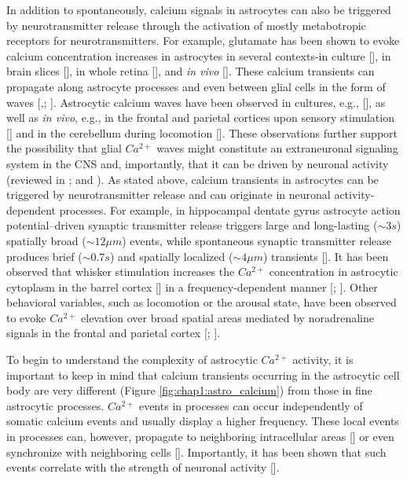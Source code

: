In addition to spontaneously, calcium signals in astrocytes can also be triggered by neurotransmitter release through the activation of mostly metabotropic receptors for neurotransmitters.
For example, glutamate has been shown to evoke calcium concentration increases in astrocytes in several contexts-in culture [\cite{cornell-bell1990}], in brain slices [\cite{dani1992}], in whole retina [\cite{newman1997calcium}], and \textit{in vivo} [\cite{wang2006}].
These calcium transients can propagate along astrocyte processes and even between glial cells in the form of waves [\cite{cornell-bell1990},\cite{dani1992}; \cite{hirase2004} \cite{nimmerjahn2004}]. 
Astrocytic calcium waves have been observed in cultures, e.g., [\cite{cornell-bell1990}], as well as \textit{in vivo}, e.g., in the frontal and parietal cortices upon sensory stimulation [\cite{ding2013}] and in the cerebellum during locomotion [\cite{nimmerjahn2009}].
These observations further support the possibility that glial $Ca^{2+}$ waves might constitute an extraneuronal signaling system in the CNS and, importantly, that it can be driven by neuronal activity (reviewed in \cite{araque2014gliotransmitters}; and \cite{bazargani2016}). 
As stated above, calcium transients in astrocytes can be triggered by neurotransmitter release and can originate in neuronal activity-dependent processes. 
For example, in hippocampal dentate gyrus astrocyte action potential–driven synaptic transmitter release triggers large and long-lasting ($\sim3 s$) spatially broad ($\sim12 \mu m$) events, while spontaneous synaptic transmitter release produces brief ($\sim 0.7 s$) and spatially localized ($\sim 4 \mu m$) transients [\cite{di2011local}].
It has been observed that whisker stimulation increases the $Ca^{2+}$ concentration in astrocytic cytoplasm in the barrel cortex [\cite{wang2006}] in a frequency-dependent manner [\cite{perea2005}; \cite{sherwood2017}]. 
Other behavioral variables, such as locomotion or the arousal state, have been observed to evoke $Ca^{2+}$ elevation over broad spatial areas mediated by noradrenaline signals in the frontal and parietal cortex [\cite{ding2013}; \cite{paukert2014norepinephrine}].

To begin to understand the complexity of astrocytic $Ca^{2+}$ activity, it is important to keep in mind that calcium transients occurring in the astrocytic cell  body are very different (Figure \ref{fig:chap1:astro_calcium}) from those in fine astrocytic processes.
$Ca^{2+}$ events in processes can occur independently of somatic calcium events and usually display a higher frequency. 
These local events in processes can, however, propagate to neighboring intracellular areas [\cite{di2011local}] or even synchronize with neighboring cells [\cite{takata2013}].
Importantly, it has been shown that such events correlate with the strength of neuronal activity [\cite{panatier2011}].

